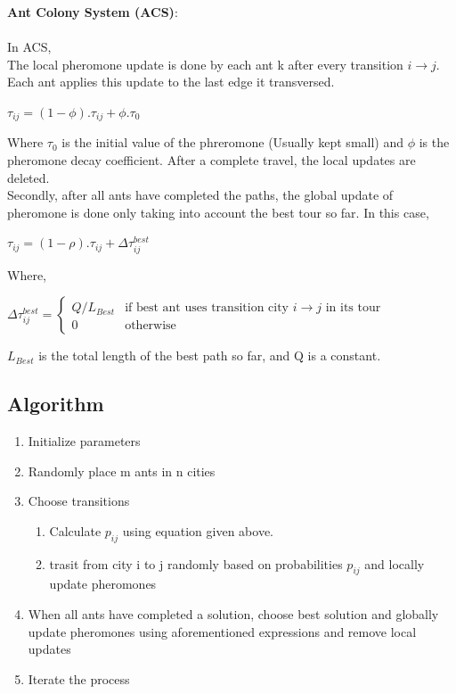 \documentclass[14pt, english]{article}
\begin{document}
\noindent
{\bf Ant Colony System (ACS)}: \\
\\
In ACS,\\
The local pheromone update is done by each ant k after every transition $i \rightarrow j$. Each ant applies this update to the last edge it transversed.
\begin{center} {$\tau_{ij} = (1-\phi).\tau_{ij} + \phi.\tau_{0}$} \end{center}
Where $\tau_{0}$ is the initial value of the phreromone (Usually kept small) and $\phi$ is the pheromone decay coefficient. After a complete travel, the local updates are deleted.\cite{Dorigo1997}\\

\noindent
Secondly, after all ants have completed the paths, the global update of pheromone is done only taking into account the best tour so far. In this case, 

\begin{center}
$\tau_{ij} = (1-\rho).\tau_{ij} + \Delta \tau_{ij}^{best}$
\end{center}
\noindent
Where,
\begin{center}
$\Delta \tau _{ij}^{best}={\begin{cases}Q/L_{Best}&{\mbox{if best ant}}{\mbox{ uses transition city }}i \rightarrow j{\mbox{ in its tour}}\\0&{\mbox{otherwise}}\end{cases}}$\\
\end{center}
\noindent
$L_{Best}$ is the total length of the best path so far, and Q is a constant.\\
 
\subsection{Algorithm}

\begin{enumerate}
	\item Initialize parameters
	\item Randomly place m ants in n cities
	\item Choose transitions
	\begin{enumerate}
		\item Calculate $p_{ij}$ using equation given above. 
		\item trasit from city {i} to {j} randomly based on probabilities $p_{ij}$ and locally update pheromones
	\end{enumerate}	 
	\item When all ants have completed a solution, choose best solution and globally update pheromones using aforementioned expressions and remove local updates
	\item Iterate the process
\end{enumerate}
\end{document}
